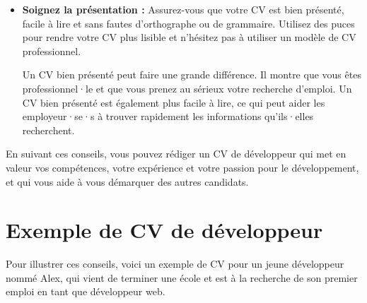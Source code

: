 \begin{itemize}
    \item \textbf{Soignez la présentation :} Assurez-vous que votre CV est bien présenté, facile à lire et sans fautes d'orthographe ou de grammaire. Utilisez des puces pour rendre votre CV plus lisible et n'hésitez pas à utiliser un modèle de CV professionnel.

    Un CV bien présenté peut faire une grande différence. Il montre que vous êtes professionnel·le et que vous prenez au sérieux votre recherche d'emploi. Un CV bien présenté est également plus facile à lire, ce qui peut aider les employeur·se·s à trouver rapidement les informations qu'ils·elles recherchent.
\end{itemize}

En suivant ces conseils, vous pouvez rédiger un CV de développeur qui met en valeur vos compétences, votre expérience et votre passion pour le développement, et qui vous aide à vous démarquer des autres candidats.

\section{Exemple de CV de développeur}
Pour illustrer ces conseils, voici un exemple de CV pour un jeune développeur nommé Alex, qui vient de terminer une école et est à la recherche de son premier emploi en tant que développeur web.

